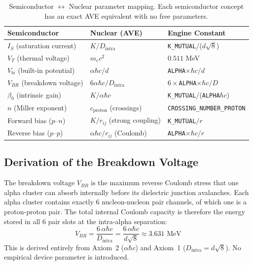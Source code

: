 \begin{table}[htbp]
\centering
\caption{Semiconductor $\leftrightarrow$ Nuclear parameter mapping. Each semiconductor concept has an exact AVE equivalent with no free parameters.}
\label{tab:semi_nuclear_map}
\begin{tabular}{l l l}
\hline
\textbf{Semiconductor} & \textbf{Nuclear (AVE)} & \textbf{Engine Constant} \\
\hline
$I_S$ (saturation current) & $K / D_\text{intra}$ & \texttt{K\_MUTUAL}/($d\sqrt{8}$) \\
$V_T$ (thermal voltage) & $m_e c^2$ & $0.511$ MeV \\
$V_{bi}$ (built-in potential) & $\alpha\hbar c / d$ & \texttt{ALPHA}$\times\hbar c / d$ \\
$V_{BR}$ (breakdown voltage) & $6\alpha\hbar c / D_\text{intra}$ & $6 \times$\texttt{ALPHA}$\times\hbar c / D$ \\
$\beta_0$ (intrinsic gain) & $K / \alpha\hbar c$ & \texttt{K\_MUTUAL}/(\texttt{ALPHA}$\hbar c$) \\
$n$ (Miller exponent) & $c_\text{proton}$ (crossings) & \texttt{CROSSING\_NUMBER\_PROTON} \\
Forward bias ($p$--$n$) & $K/r_{ij}$ (strong coupling) & \texttt{K\_MUTUAL}$/r$ \\
Reverse bias ($p$--$p$) & $\alpha\hbar c / r_{ij}$ (Coulomb) & \texttt{ALPHA}$\times\hbar c / r$ \\
\hline
\end{tabular}
\end{table}

\subsection{Derivation of the Breakdown Voltage}

The breakdown voltage $V_{BR}$ is the maximum reverse Coulomb stress that one alpha cluster can absorb internally before its dielectric junction avalanches. Each alpha cluster contains exactly 6 nucleon-nucleon pair channels, of which one is a proton-proton pair. The total internal Coulomb capacity is therefore the energy stored in all 6 pair slots at the intra-alpha separation:
\begin{equation}
    V_{BR} = \frac{6 \, \alpha\hbar c}{D_\text{intra}} = \frac{6 \, \alpha\hbar c}{d\sqrt{8}} \approx 3.631 \text{ MeV}
    \label{eq:V_BR}
\end{equation}
This is derived entirely from Axiom~2 ($\alpha\hbar c$) and Axiom~1 ($D_\text{intra} = d\sqrt{8}$). No empirical device parameter is introduced.

